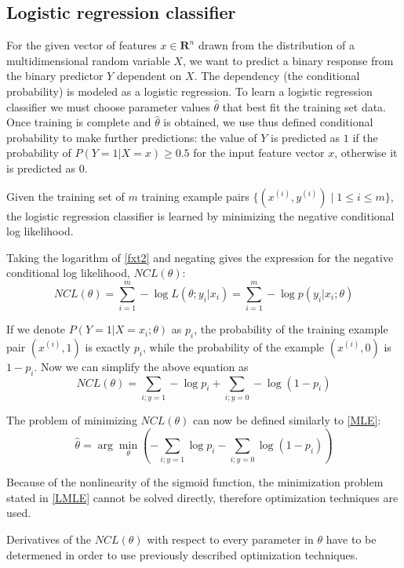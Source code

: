 \documentclass[times, utf8, zavrsni]{fer}
\newcommand{\argmin}{\arg\!\min}
\begin{document}
\subsection{Logistic regression classifier}
For the given vector of features $x \in \mathbf{R}^n$ drawn from the distribution of a multidimensional random variable $X$, we want to predict a binary response from the binary predictor $Y$ dependent on $X$. The dependency (the conditional probability) is modeled as a logistic regression. To learn a logistic regression classifier we must choose parameter values $\hat\theta$ that best fit the training set data. Once training is complete and $\hat\theta$ is obtained, we use thus defined conditional probability to make further predictions: the value of $Y$ is predicted as $1$ if the probability of $P(Y = 1| X = x) \geq 0.5$ for the input feature vector $x$, otherwise it is predicted as $0$.

Given the training set of $m$ training example pairs $\{(x^{(i)}, y^{(i)}) \; | \; 1 \le i \le m\}$, the logistic regression classifier is learned by  minimizing the negative conditional log likelihood.
 
Taking the logarithm of \eqref{fxt2} and negating gives the expression for the negative conditional log likelihood, $NCL(\theta)$:
\begin{equation}
NCL(\theta) = \sum_{i = 1}^{m} -\log L(\theta;y_i|x_i) = \sum_{i = 1}^{m} -\log p(y_i | x_i; \theta)
\label{NCL}
\end{equation}

If we denote $P(Y = 1 | X = x_i; \theta)$ as $p_i$, the probability of the training example pair $(x^{(i)}, 1)$ is exactly $p_i$, while the probability of the example $(x^{(i)}, 0)$ is $1 - p_i$.  Now we can simplify the above equation as \begin{equation}
NCL(\theta)  = \sum_{i;y=1} -\log p_i + \sum_{i;y=0} -\log (1 - p_i)
\end{equation}

The  problem of minimizing $NCL(\theta)$ can now be defined similarly to \ref{MLE}:
\begin{equation}
\label{LMLE}
 \hat\theta = \argmin_\theta (-{\sum_{i;y = 1} \log p_i - \sum_{i;y=0} \log(1 - p_i)})
\end{equation}

Because of the nonlinearity of the sigmoid function, the minimization problem stated in \eqref{LMLE} cannot be solved directly, therefore optimization techniques are used. 

Derivatives of the $NCL(\theta)$ with respect to every parameter in $\theta$ have to be determened in order to use previously described optimization techniques.
\end{document}
